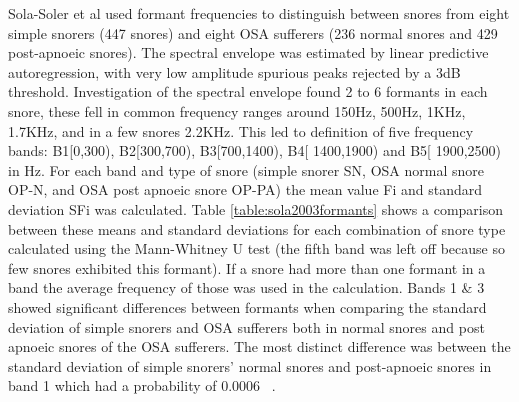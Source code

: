 Sola-Soler et al used formant frequencies to distinguish between snores from eight simple snorers (447 snores) and eight OSA sufferers (236 normal snores and 429 post-apnoeic snores). The spectral envelope was estimated by linear predictive autoregression, with very low amplitude spurious peaks rejected by a 3dB threshold. Investigation of the spectral envelope found 2 to 6 formants in each snore, these fell in common frequency ranges around 150Hz, 500Hz, 1KHz, 1.7KHz, and in a few snores 2.2KHz. This led to definition of five frequency bands: B1[0,300), B2[300,700), B3[700,1400), B4[ 1400,1900) and B5[ 1900,2500) in Hz. For each band and type of snore (simple snorer SN, OSA normal snore OP-N, and OSA post apnoeic snore OP-PA) the mean value Fi and standard deviation SFi was calculated. Table \ref{table:sola2003formants} shows a comparison between these means and standard deviations for each combination of snore type calculated using the Mann-Whitney U test (the fifth band was left off because so few snores exhibited this formant). If a snore had more than one formant in a band the average frequency of those was used in the calculation. Bands 1 \& 3 showed significant differences between formants when comparing the standard deviation of simple snorers and OSA sufferers both in normal snores and post apnoeic snores of the OSA sufferers. The most distinct difference was between the standard deviation of simple snorers’ normal snores and post-apnoeic snores in band 1 which had a probability of 0.0006 ~\cite{sola2003spectral}.

